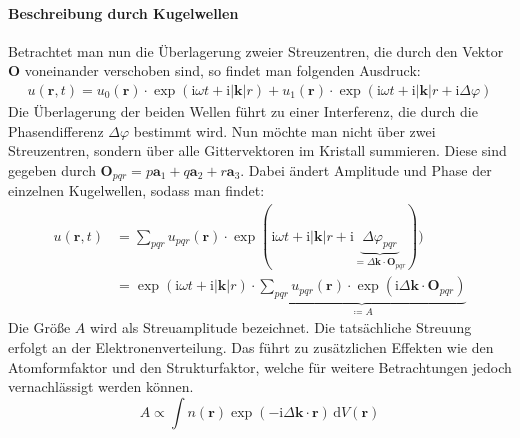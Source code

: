 \paragraph{Beschreibung durch Kugelwellen}
Betrachtet man nun die Überlagerung zweier Streuzentren, die durch den Vektor $\mathbf{O}$ voneinander verschoben sind,
so findet man folgenden Ausdruck:
\begin{align*}
    u(\mathbf{r},t)=u_{0}(\mathbf{r})\cdot \exp(\mathrm{i}\omega t+\mathrm{i}\lvert \mathbf{k}
    \rvert r) + u_{1}(\mathbf{r}) \cdot \exp(\mathrm{i}\omega t + \mathrm{i}\lvert \mathbf{k}
    \rvert r+\mathrm{i}\Delta\varphi)
\end{align*}
Die Überlagerung der beiden Wellen führt zu einer Interferenz, die durch die Phasendifferenz $\Delta\varphi$ bestimmt
wird.
Nun möchte man nicht über zwei Streuzentren, sondern über alle Gittervektoren im Kristall summieren.
Diese sind gegeben durch $\mathbf{O}_{pqr}=p\mathbf{a}_{1}+q\mathbf{a}_{2}+r\mathbf{a}_{3}$.
Dabei ändert Amplitude und Phase der einzelnen Kugelwellen, sodass man findet:
\begin{align*}
    u(\mathbf{r},t)
    &=\sum_{pqr} u_{pqr}(\mathbf{r})\cdot \exp(\mathrm{i}\omega t+\mathrm{i}
    \lvert \mathbf{k} \rvert r+\mathrm{i}\underbrace{ \Delta\varphi_{pqr} }_{ = \Delta
    \mathbf{k}\cdot \mathbf{O}_{pqr}})) \\
    &=\exp(\mathrm{i}\omega t+\mathrm{i}\lvert \mathbf{k} \rvert r)\cdot
    \underbrace{ \sum_{pqr}u_{pqr}(\mathbf{r})\cdot \exp(\mathrm{i}\Delta \mathbf{k}
    \cdot \mathbf{O}_{pqr}) }_{ \coloneqq A }
\end{align*}
Die Größe $A$ wird als Streuamplitude bezeichnet.
Die tatsächliche Streuung erfolgt an der Elektronenverteilung.
Das führt zu zusätzlichen Effekten wie den Atomformfaktor und den Strukturfaktor,
welche für weitere Betrachtungen jedoch vernachlässigt werden können.
\begin{equation*}
    A \propto \int n(\mathbf{r}) \exp(-\mathrm{i} \Delta \mathbf{k}\cdot
    \mathbf{r}) \, \mathrm{d}V(\mathbf{r})
\end{equation*}

